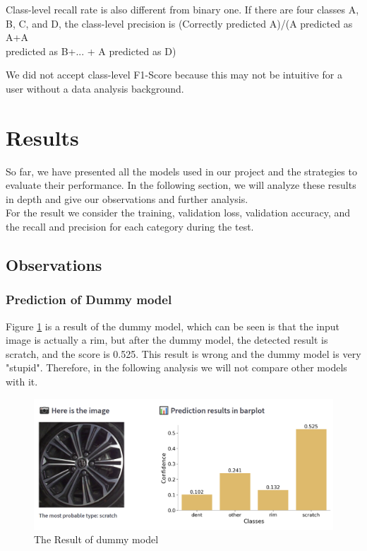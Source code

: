 \documentclass[lang=english,inputenc=utf8,fontsize=10pt]{ldvarticle}
\begin{document}
Class-level recall rate is also different from binary one. If there are four classes A, B, C, and D, the class-level precision is (Correctly predicted A)/(A predicted as A+A\\ predicted as B+... + A predicted as D)

We did not accept class-level F1-Score because this may not be intuitive for a user without a data analysis background.




\newpage

\section{Results}
So far, we have presented all the models used in our project and the strategies to evaluate their performance. In the following section, we will analyze these results in depth and give our observations and further analysis.\\
For the result we consider the training, validation loss, validation accuracy, and the recall and precision for each category during the test. 

\subsection{Observations}

\subsubsection{Prediction of Dummy model}
Figure \ref{dummy} is a result of the dummy model, which can be seen is that the input image is actually a rim, but after the dummy model, the detected result is scratch, and the score is 0.525. This result is wrong and the dummy model is very "stupid". Therefore, in the following analysis we will not compare other models with it.\\

\begin{figure}[H]
    \centering
    \includegraphics[scale=0.2]{resultDummy.png}
    \caption{The Result of dummy model}
    \label{dummy}
\end{figure}
\end{document}
